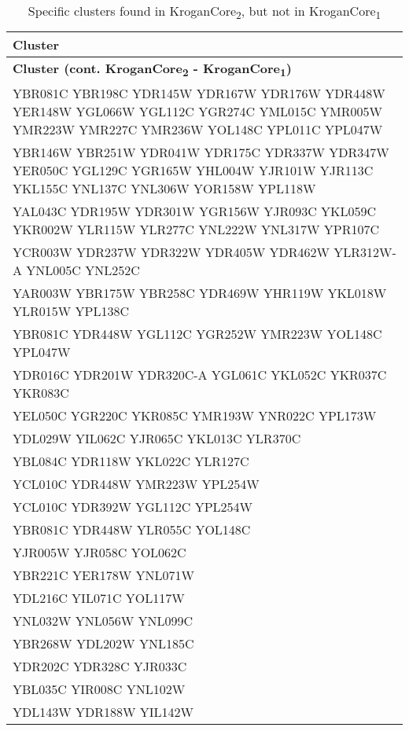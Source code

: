 \setlength{\extrarowheight}{2pt}
\renewcommand{\arraystretch}{1.2}
\begin{longtable}{| m{27em} |}
\caption{Specific clusters found in KroganCore\textsubscript{2}, but not in KroganCore\textsubscript{1}} \\
\hline
\textbf{Cluster} \\
\hline
\endfirsthead
\hline
\textbf{Cluster (cont. KroganCore\textsubscript{2} - KroganCore\textsubscript{1})} \\
\hline
\endhead
\hline
\endfoot
\hline
\endlastfoot
YBR081C YBR198C YDR145W YDR167W YDR176W YDR448W YER148W YGL066W YGL112C YGR274C YML015C YMR005W YMR223W YMR227C YMR236W YOL148C YPL011C YPL047W \\
\hline
YBR146W YBR251W YDR041W YDR175C YDR337W YDR347W YER050C YGL129C YGR165W YHL004W YJR101W YJR113C YKL155C YNL137C YNL306W YOR158W YPL118W \\
\hline
YAL043C YDR195W YDR301W YGR156W YJR093C YKL059C YKR002W YLR115W YLR277C YNL222W YNL317W YPR107C \\
\hline
YCR003W YDR237W YDR322W YDR405W YDR462W YLR312W-A YNL005C YNL252C \\
\hline
YAR003W YBR175W YBR258C YDR469W YHR119W YKL018W YLR015W YPL138C \\
\hline
YBR081C YDR448W YGL112C YGR252W YMR223W YOL148C YPL047W \\
\hline
YDR016C YDR201W YDR320C-A YGL061C YKL052C YKR037C YKR083C \\
\hline
YEL050C YGR220C YKR085C YMR193W YNR022C YPL173W \\
\hline
YDL029W YIL062C YJR065C YKL013C YLR370C \\
\hline
YBL084C YDR118W YKL022C YLR127C \\
\hline
YCL010C YDR448W YMR223W YPL254W \\
\hline
YCL010C YDR392W YGL112C YPL254W \\
\hline
YBR081C YDR448W YLR055C YOL148C \\
\hline
YJR005W YJR058C YOL062C \\
\hline
YBR221C YER178W YNL071W \\
\hline
YDL216C YIL071C YOL117W \\
\hline
YNL032W YNL056W YNL099C \\
\hline
YBR268W YDL202W YNL185C \\
\hline
YDR202C YDR328C YJR033C \\
\hline
YBL035C YIR008C YNL102W \\
\hline
YDL143W YDR188W YIL142W \\

\end{longtable}
